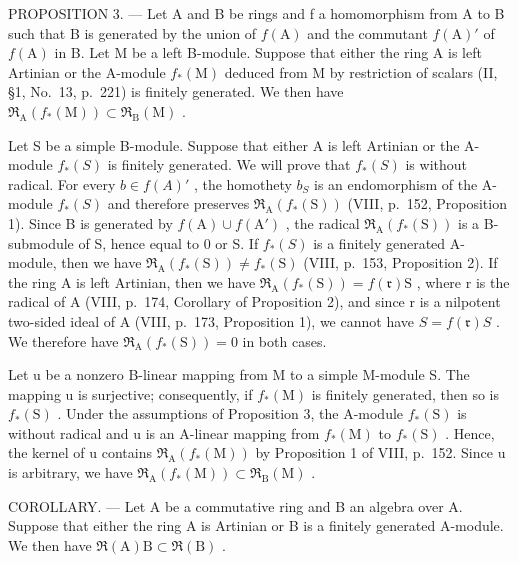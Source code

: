 PROPOSITION 3. --- Let A and B be rings and f a homomorphism from A to B such that B is generated by the union of \(f(\mathrm{A})\) and the commutant \(f(\mathrm{A})'\) of \(f(\mathrm{A})\) in B. Let M be a left B-module. Suppose that either the ring A is left Artinian or the A-module \(f_{*}(\mathrm{M})\) deduced from M by restriction of scalars (II, §1, No.~13, p.~221) is finitely generated. We then have \(\mathfrak{R}_{\mathrm{A}}(f_{*}(\mathrm{M})) \subset \mathfrak{R}_{\mathrm{B}}(\mathrm{M})\) .

Let S be a simple B-module. Suppose that either A is left Artinian or the A-module \(f_{*}(S)\) is finitely generated. We will prove that \(f_{*}(S)\) is without radical. For every \(b \in f(A)'\) , the homothety \(b_{S}\) is an endomorphism of the A-module \(f_{*}(S)\) and therefore preserves \(\mathfrak{R}_{\mathrm{A}}(f_{*}(\mathrm{S}))\) (VIII, p.~152, Proposition 1). Since B is generated by \(f(\mathrm{A}) \cup f(\mathrm{A}')\) , the radical \(\mathfrak{R}_{\mathrm{A}}(f_{*}(\mathrm{S}))\) is a B-submodule of S, hence equal to 0 or S. If \(f_{*}(S)\) is a finitely generated A-module, then we have \(\mathfrak{R}_{\mathrm{A}}(f_{*}(\mathrm{S})) \neq f_{*}(\mathrm{S})\) (VIII, p.~153, Proposition 2). If the ring A is left Artinian, then we have \(\mathfrak{R}_{\mathrm{A}}(f_{*}(\mathrm{S})) = f(\mathfrak{r})\mathrm{S}\) , where r is the radical of A (VIII, p.~174, Corollary of Proposition 2), and since r is a nilpotent two-sided ideal of A (VIII, p.~173, Proposition 1), we cannot have \(S = f(\mathfrak{r})S\) . We therefore have \(\mathfrak{R}_{\mathrm{A}}(f_{*}(\mathrm{S})) = 0\) in both cases.

Let u be a nonzero B-linear mapping from M to a simple M-module S. The mapping u is surjective; consequently, if \(f_{*}(\mathrm{M})\) is finitely generated, then so is \(f_{*}(\mathrm{S})\) . Under the assumptions of Proposition 3, the A-module \(f_{*}(\mathrm{S})\) is without radical and u is an A-linear mapping from \(f_{*}(\mathrm{M})\) to \(f_{*}(\mathrm{S})\) . Hence, the kernel of u contains \(\mathfrak{R}_{\mathrm{A}}(f_{*}(\mathrm{M}))\) by Proposition 1 of VIII, p.~152. Since u is arbitrary, we have \(\mathfrak{R}_{\mathrm{A}}(f_{*}(\mathrm{M})) \subset \mathfrak{R}_{\mathrm{B}}(\mathrm{M})\) .

COROLLARY. --- Let A be a commutative ring and B an algebra over A. Suppose that either the ring A is Artinian or B is a finitely generated A-module. We then have \(\Re(\mathrm{A})\mathrm{B}\subset\Re(\mathrm{B})\) .

